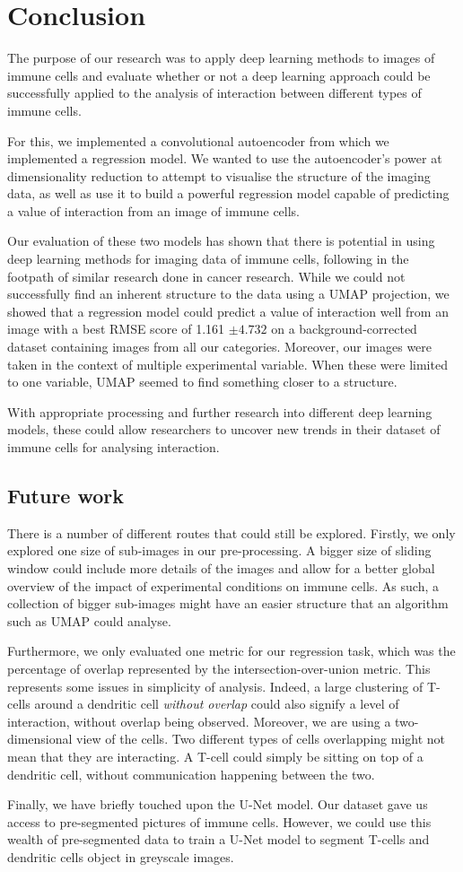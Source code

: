 \chapter{Conclusion}

The purpose of our research was to apply deep learning methods to images of immune cells and evaluate whether or not a deep learning approach could be successfully applied to the analysis of interaction between different types of immune cells.

For this, we implemented a convolutional autoencoder from which we implemented a regression model. We wanted to use the autoencoder's power at dimensionality reduction to attempt to visualise the structure of the imaging data, as well as use it to build a powerful regression model capable of predicting a value of interaction from an image of immune cells.

Our evaluation of these two models has shown that there is potential in using deep learning methods for imaging data of immune cells, following in the footpath of similar research done in cancer research. While we could not successfully find an inherent structure to the data using a UMAP projection, we showed that a regression model could predict a value of interaction well from an image with a best RMSE score of 1.161 $\pm 4.732$ on a background-corrected dataset containing images from all our categories. Moreover, our images were taken in the context of multiple experimental variable. When these were limited to one variable, UMAP seemed to find something closer to a structure.

With appropriate processing and further research into different deep learning models, these could allow researchers to uncover new trends in their dataset of immune cells for analysing interaction.

\section{Future work}

There is a number of different routes that could still be explored. Firstly, we only explored one size of sub-images in our pre-processing. A bigger size of sliding window could include more details of the images and allow for a better global overview of the impact of experimental conditions on immune cells. As such, a collection of bigger sub-images might have an easier structure that an algorithm such as UMAP could analyse.

Furthermore, we only evaluated one metric for our regression task, which was the percentage of overlap represented by the intersection-over-union metric. This represents some issues in simplicity of analysis. Indeed, a large clustering of T-cells around a dendritic cell \textit{without overlap} could also signify a level of interaction, without overlap being observed. Moreover, we are using a two-dimensional view of the cells. Two different types of cells overlapping might not mean that they are interacting. A T-cell could simply be sitting on top of a dendritic cell, without communication happening between the two.

Finally, we have briefly touched upon the U-Net model. Our dataset gave us access to pre-segmented pictures of immune cells. However, we could use this wealth of pre-segmented data to train a U-Net model to segment T-cells and dendritic cells object in greyscale images.
